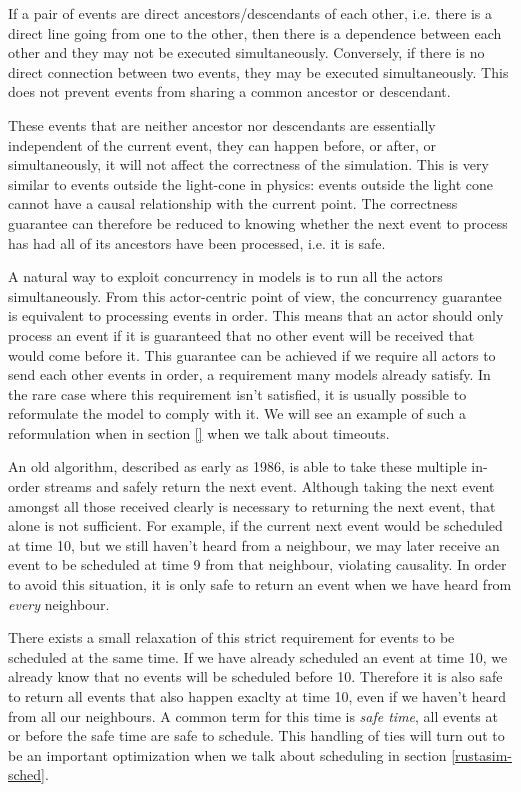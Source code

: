 If a pair of events are direct ancestors/descendants of each other, i.e. there is a direct line going from one to the other, then there is a dependence between each other and they may not be executed simultaneously.
Conversely, if there is no direct connection between two events, they may be executed simultaneously.
This does not prevent events from sharing a common ancestor or descendant.

These events that are neither ancestor nor descendants are essentially independent of the current event, they can happen before, or after, or simultaneously, it will not affect the correctness of the simulation.
This is very similar to events outside the light-cone in physics: events outside the light cone cannot have a causal relationship with the current point.
The correctness guarantee can therefore be reduced to knowing whether the next event to process has had all of its ancestors have been processed, i.e. it is safe.

A natural way to exploit concurrency in models is to run all the actors simultaneously.
From this actor-centric point of view, the concurrency guarantee is equivalent to processing events in order.
This means that an actor should only process an event if it is guaranteed that no other event will be received that would come before it.
This guarantee can be achieved if we require all actors to send each other events in order, a requirement many models already satisfy.
In the rare case where this requirement isn't satisfied, it is usually possible to reformulate the model to comply with it.
We will see an example of such a reformulation when in section \ref{} when we talk about timeouts. %

An old algorithm, described as early as 1986\cite{misra_distributed_1986}, is able to take these multiple in-order streams and safely return the next event.
Although taking the next event amongst all those received clearly is necessary to returning the next event, that alone is not sufficient.
For example, if the current next event would be scheduled at time 10, but we still haven't heard from a neighbour, we may later receive an event to be scheduled at time 9 from that neighbour, violating causality.
In order to avoid this situation, it is only safe to return an event when we have heard from \emph{every} neighbour.

There exists a small relaxation of this strict requirement for events to be scheduled at the same time.
If we have already scheduled an event at time 10, we already know that no events will be scheduled before 10.
Therefore it is also safe to return all events that also happen exaclty at time 10, even if we haven't heard from all our neighbours.
A common term for this time is \emph{safe time}, all events at or before the safe time are safe to schedule.
This handling of ties will turn out to be an important optimization when we talk about scheduling in section \ref{rustasim-sched}. %

